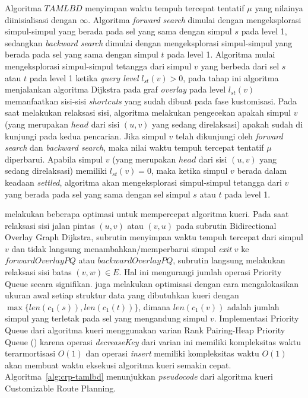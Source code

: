 Algoritma $TAMLBD$ menyimpan waktu tempuh tercepat tentatif $\mu$ yang nilainya diinisialisasi dengan $\infty$. Algoritma \textit{forward search} dimulai dengan mengeksplorasi simpul-simpul yang berada pada sel yang sama dengan simpul $s$ pada level 1, sedangkan \textit{backward search} dimulai dengan mengeksplorasi simpul-simpul yang berada pada sel yang sama dengan simpul $t$ pada level 1. Algoritma mulai mengeksplorasi simpul-simpul tetangga dari simpul $v$ yang berbeda dari sel $s$ atau $t$ pada level 1 ketika \textit{query level} $l_{st}(v)>0$, pada tahap ini algoritma menjalankan algoritma Dijkstra pada graf \textit{overlay} pada level $l_{st}(v)$ memanfaatkan sisi-sisi \textit{shortcuts} yang sudah dibuat pada fase kustomisasi. Pada saat melakukan relaksasi sisi, algoritma melakukan pengecekan apakah simpul $v$ (yang merupakan $head$ dari sisi $(u,v)$ yang sedang direlaksasi) apakah sudah di kunjungi pada kedua pencarian. Jika simpul $v$ telah dikunjungi oleh \textit{forward search} dan \textit{backward search}, maka nilai waktu tempuh tercepat tentatif $\mu$ diperbarui. Apabila simpul $v$ (yang merupakan $head$ dari sisi $(u,v)$ yang sedang direlaksasi) memiliki $l_{st}(v) = 0$, maka ketika simpul $v$ berada dalam keadaan \textit{settled}, algoritma akan mengeksplorasi simpul-simpul tetangga dari $v$ yang berada pada sel yang sama dengan sel simpul $s$ atau $t$ pada level 1.

\cite{Delling2015} melakukan beberapa optimasi untuk mempercepat algoritma kueri. Pada saat relaksasi sisi jalan pintas $(u,v)$ atau $(v,u)$ pada subrutin Bidirectional Overlay Graph Dijkstra, subrutin menyimpan waktu tempuh tercepat dari simpul $v$ dan tidak langsung menambahkan/memperbarui simpul \textit{exit} $v$ ke $forwardOverlayPQ$ atau $backwardOverlayPQ$, subrutin langsung melakukan relaksasi sisi batas $(v,w)\in E$. Hal ini mengurangi jumlah operasi Priority Queue secara signifikan. \cite{Delling2015} juga melakukan optimisasi dengan cara mengalokasikan ukuran awal setiap struktur data yang dibutuhkan kueri dengan $\max\{len(c_1(s)),len(c_1(t))\}$, dimana $len(c_1(v))$ adalah jumlah simpul yang terletak pada sel yang mengandung simpul $v$. Implementasi Priority Queue dari algoritma kueri menggunakan varian Rank Pairing-Heap Priority Queue (\cite{Haeupler2009}) karena operasi \textit{decreaseKey} dari varian ini memiliki kompleksitas waktu terarmortisasi $O(1)$ dan operasi \textit{insert} memiliki kompleksitas waktu $O(1)$ akan membuat waktu eksekusi algoritma kueri semakin cepat. Algoritma~\ref{alg:crp-tamlbd} menunjukkan \textit{pseudocode} dari algoritma kueri Customizable Route Planning.


